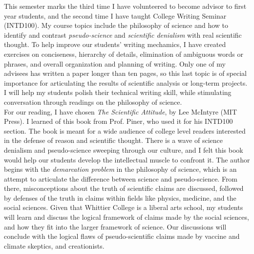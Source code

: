 \documentclass[../../../main.tex]{subfiles}
\begin{document}
\label{sec:first_year}

This semester marks the third time I have volunteered to become advisor to first year students, and the second time I have taught College Writing Seminar (INTD100).  My course topics include the philosophy of science and how to identify and contrast \textit{pseudo-science} and \textit{scientific denialism} with real scientific thought.  To help improve our students' writing mechamics, I have created exercises on conciseness, hierarchy of details, elimination of ambiguous words or phrases, and overall organization and planning of writing.  Only one of my advisees has written a paper longer than ten pages, so this last topic is of special importance for articulating the results of scientific analysis or long-term projects.  I will help my students polish their technical writing skill, while stimulating conversation through readings on the philosophy of science.
\\
\vspace{0.15cm}
For our reading, I have chosen \textit{The Scientific Attitude}, by Lee McIntyre (MIT Press).  I learned of this book from Prof. Piner, who used it for his INTD100 section.  The book is meant for a wide audience of college level readers interested in the defense of reason and scientific thought.  There is a wave of science denialism and pseudo-science sweeping through our culture, and I felt this book would help our students develop the intellectual muscle to confront it.  The author begins with the \textit{demarcation problem} in the philosophy of science, which is an attempt to articulate the difference between science and pseudo-science.  From there, misconceptions about the truth of scientific claims are discussed, followed by defenses of the truth in claims within fields like physics, medicine, and the social sciences.  Given that Whittier College is a liberal arts school, my students will learn and discuss the logical framework of claims made by the social sciences, and how they fit into the larger framework of science.  Our discussions will conclude with the logical flaws of pseudo-scientific claims made by vaccine and climate skeptics, and creationists.
\end{document}
